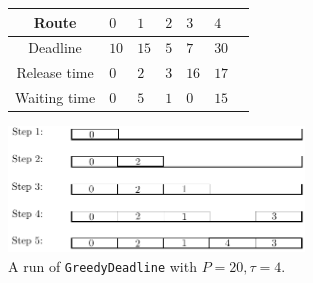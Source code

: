 \documentclass[a4paper,10pt]{article}
\newcommand\greedydeadline{\texttt{GreedyDeadline}\xspace}
\begin{document}
    \begin{figure}
          \begin{center}
   \begin{tabularx}{0.7\textwidth}{|c|X|X|X|X|X|X|}
    \hline
     Route& $0$ & $1$ & $2$& $3$ & $4$\\
    \hline
    Deadline & $10$ &$15$&$5$&$7$&$30$\\
    \hline
     Release time & $0$ &$2$&$3$&$16$&$17$\\
    \hline
    Waiting time & $0$ &$5$&$1$&$0$&$15$\\
    \hline
      \end{tabularx}
      
      
      \includegraphics[width=0.7\textwidth]{examplegreedy.pdf}
      \caption{A run of \greedydeadline with $P = 20, \tau = 4$.}
           \label{fig:greedydeadline}
      \end{center}
      
    \end{figure}

     
   
       
\end{document}
